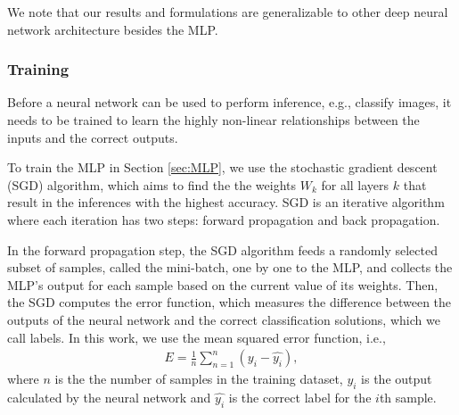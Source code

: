 \documentclass[conference]{IEEEtran}
\begin{document}

We note that our results and formulations are generalizable to other deep neural network architecture besides the MLP. 

\subsubsection{Training}\label{sec:training}
Before a neural network can be used to perform inference, e.g., classify images, it needs to be trained to learn the highly non-linear
relationships between the inputs and the correct outputs. 

To train the MLP in Section \ref{sec:MLP}, we use the stochastic gradient descent (SGD) algorithm, which aims to find the 
the weights $W_k$ for all layers $k$ that result in the inferences with the highest accuracy.  SGD is an iterative algorithm where each
iteration has two steps: forward propagation and back propagation.

In the forward propagation step, the SGD algorithm feeds a randomly
selected subset of samples, called the mini-batch, one by one to the MLP, and collects the MLP's output for each sample based on the
current value of its weights.
Then, the SGD computes the error function, which measures the difference between the outputs of the neural network and the correct 
classification solutions, which we call labels. In this work, we use the mean squared error function, i.e., 
\begin{align}\label{eq:errorFunction}
 E= \frac{1}{n} \sum_{n=1}^{n}(y_i -\hat{y_i}),
\end{align}
where $n$ is the the number of samples in the training dataset, $y_i$ is the output calculated by the neural network and 
$\hat{y_i}$ is the correct label for the $i$th sample.
\end{document}
